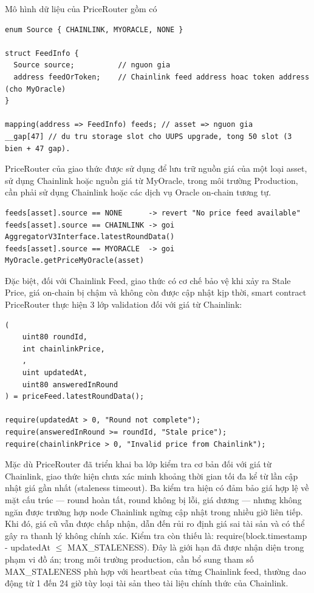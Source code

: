\documentclass[../DoAn.tex]{subfiles}
\begin{document}
Mô hình dữ liệu của PriceRouter gồm có

\begin{lstlisting}
enum Source { CHAINLINK, MYORACLE, NONE }

struct FeedInfo {
  Source source;          // nguon gia
  address feedOrToken;    // Chainlink feed address hoac token address (cho MyOracle)
}

mapping(address => FeedInfo) feeds; // asset => nguon gia
__gap[47] // du tru storage slot cho UUPS upgrade, tong 50 slot (3 bien + 47 gap).
\end{lstlisting}


PriceRouter của giao thức được sử dụng để lưu trữ nguồn giá của một loại asset, sử dụng Chainlink hoặc nguồn giá từ MyOracle, trong môi trường Production, cần phải sử dụng Chainlink hoặc các dịch vụ Oracle on-chain tương tự.
\begin{lstlisting}
feeds[asset].source == NONE      -> revert "No price feed available"
feeds[asset].source == CHAINLINK -> goi AggregatorV3Interface.latestRoundData()
feeds[asset].source == MYORACLE  -> goi MyOracle.getPriceMyOracle(asset)
\end{lstlisting}

Đặc biệt, đối với Chainlink Feed, giao thức có cơ chế bảo vệ khi xảy ra Stale Price, giá on-chain bị chậm và không còn được cập nhật kịp thời, smart contract PriceRouter thực hiện 3 lớp validation đối với giá từ Chainlink:

\begin{lstlisting}
(
    uint80 roundId,
    int chainlinkPrice,
    ,
    uint updatedAt,
    uint80 answeredInRound
) = priceFeed.latestRoundData();

require(updatedAt > 0, "Round not complete");
require(answeredInRound >= roundId, "Stale price");
require(chainlinkPrice > 0, "Invalid price from Chainlink");
\end{lstlisting}

Mặc dù PriceRouter đã triển khai ba lớp kiểm tra cơ bản đối với giá từ Chainlink, giao thức hiện chưa xác minh khoảng thời gian tối đa kể từ lần cập nhật giá gần nhất (staleness timeout). Ba kiểm tra hiện có đảm bảo giá hợp lệ về mặt cấu trúc --- round hoàn tất, round không bị lỗi, giá dương --- nhưng không ngăn được trường hợp node Chainlink ngừng cập nhật trong nhiều giờ liên tiếp. Khi đó, giá cũ vẫn được chấp nhận, dẫn đến rủi ro định giá sai tài sản và có thể gây ra thanh lý không chính xác. Kiểm tra còn thiếu là: require(block.timestamp - updatedAt $\leq$ MAX\_STALENESS). Đây là giới hạn đã được nhận diện trong phạm vi đồ án; trong môi trường production, cần bổ sung tham số MAX\_STALENESS phù hợp với heartbeat của từng Chainlink feed, thường dao động từ 1 đến 24 giờ tùy loại tài sản theo tài liệu chính thức của Chainlink.
\end{document}

